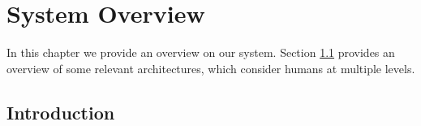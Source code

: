 
\chapter{System Overview}
\label{chapter-system_overview}



In this chapter we provide an overview on our system. Section \ref{sec:overview-intro} provides an overview of some relevant architectures, which consider humans at multiple levels. 

\section{Introduction}
\label{sec:overview-intro}

